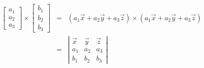 \documentclass[12pt]{article}
\begin{document}
    \begin{eqnarray*}
        \left[ \begin{array}{c}
            a_1 \\ a_2 \\ a_3
        \end{array} \right]
        \times
        \left[ \begin{array}{c}
            b_1 \\ b_2 \\ b_3
        \end{array} \right] &
        = &
        \left(
            a_1\overrightarrow{x} + a_2\overrightarrow{y} + a_3\overrightarrow{z}
        \right)
        \times
        \left(
            a_1\overrightarrow{x} + a_2\overrightarrow{y} + a_3\overrightarrow{z}
        \right) \\
        & = &
        \left| \begin{array}{ccc}
            \overrightarrow{x} & \overrightarrow{y} & \overrightarrow{z} \\
            a_1 & a_2 & a_3 \\
            b_1 & b_2 & b_3
        \end{array} \right|
    \end{eqnarray*}
\end{document}
